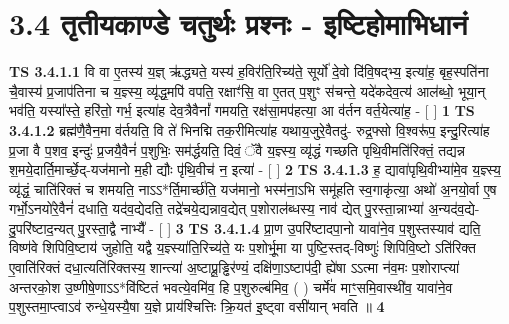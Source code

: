 \documentclass[17pt]{extarticle}
\begin{document}
     \section*{ 3.4      तृतीयकाण्डे चतुर्थः प्रश्नः - इष्टिहोमाभिधानं }
                                        \textbf{ TS 3.4.1.1} \newline
                  वि वा ए॒तस्य॑ य॒ज्ञ् ऋ॑द्ध्यते॒ यस्य॑ ह॒विर॑ति॒रिच्य॑ते॒ सूर्यो॑ दे॒वो दि॑वि॒षद्भ्य॒ इत्या॑ह॒ बृह॒स्पति॑ना चै॒वास्य॑ प्र॒जाप॑तिना च य॒ज्ञ्स्य॒ व्यृ॑द्ध॒मपि॑ वपति॒ रक्षाꣳ॑सि॒ वा ए॒तत् प॒शुꣳ स॑चन्ते॒ यदे॑कदेव॒त्य॑ आल॑ब्धो॒ भूया॒न् भव॑ति॒ यस्या᳚स्ते॒ हरि॑तो॒ गर्भ॒ इत्या॑ह देव॒त्रैवैनां᳚ गमयति॒ रक्ष॑सा॒मप॑हत्या॒ आ व॑र्तन वर्त॒येत्या॑ह॒ - [  ] \textbf{  1} \newline
                  \newline
                                \textbf{ TS 3.4.1.2} \newline
                  ब्रह्म॑णै॒वैन॒मा व॑र्तयति॒ वि ते॑ भिनद्मि तक॒रीमित्या॑ह यथाय॒जुरे॒वैतदु॑- रुद्र॒फ्सो वि॒श्वरू॑प॒ इन्दु॒रित्या॑ह प्र॒जा वै प॒शव॒ इन्दुः॑ प्र॒जयै॒वैनं॑ प॒शुभिः॒ सम॑र्द्धयति॒ दिवं॒ ॅवै य॒ज्ञ्स्य॒ व्यृ॑द्धं गच्छति पृथि॒वीमति॑रिक्तं॒ तद्यन्न श॒मये॒दार्ति॒मार्च्छे॒द्-यज॑मानो म॒ही द्यौः पृ॑थि॒वीच॑ न॒ इत्या॑ - [  ] \textbf{  2} \newline
                  \newline
                                \textbf{ TS 3.4.1.3} \newline
                  ह॒ द्यावा॑पृथि॒वीभ्या॑मे॒व य॒ज्ञ्स्य॒ व्यृ॑द्धं॒ चाति॑रिक्तं च शमयति॒ नाऽऽ*र्ति॒मार्च्छ॑ति॒ यज॑मानो॒ भस्म॑ना॒ऽभि समू॑हति स्व॒गाकृ॑त्या॒ अथो॑ अ॒नयो॒र्वा ए॒ष गर्भो॒ऽनयो॑रे॒वैनं॑ दधाति॒ यद॑व॒द्येदति॒ तद्रे॑चये॒द्यन्नाव॒द्येत् प॒शोराल॑ब्धस्य॒ नाव॑ द्येत् पु॒रस्ता॒न्नाभ्या॑ अ॒न्यद॑व॒द्ये-दु॒परि॑ष्टाद॒न्यत् पु॒रस्ता॒द्वै नाभ्यै᳚ - [  ] \textbf{  3} \newline
                  \newline
                                \textbf{ TS 3.4.1.4} \newline
                  प्रा॒ण उ॒परि॑ष्टादपा॒नो यावा॑ने॒व प॒शुस्तस्याव॑ द्यति॒ विष्ण॑वे शिपिवि॒ष्टाय॑ जुहोति॒ यद्वै य॒ज्ञ्स्या॑ति॒रिच्य॑ते॒ यः प॒शोर्भू॒मा या पुष्टि॒स्तद्-विष्णुः॑ शिपिवि॒ष्टो ऽति॑रिक्त ए॒वाति॑रिक्तं दधा॒त्यति॑रिक्तस्य॒ शान्त्या॑ अ॒ष्टाप्रू॒ड्ढिर॑ण्यं॒ दक्षि॑णा॒ऽष्टाप॑दी॒ ह्ये॑षा ऽऽत्मा न॑व॒मः प॒शोराप्त्या॑ अन्तरको॒श उ॒ष्णीषे॒णाऽऽ*वि॑ष्टितं भवत्ये॒वमि॑व॒ हि प॒शुरुल्ब॑मिव॒ ( ) चर्मे॑व माꣳ॒॒समि॒वास्थी॑व॒ यावा॑ने॒व प॒शुस्तमा॒प्त्वाऽव॑ रुन्धे॒यस्यै॒षा य॒ज्ञे प्राय॑श्चित्तिः क्रि॒यत॑ इ॒ष्ट्वा वसी॑यान् भवति ॥ \textbf{  4} \newline
\end{document}

